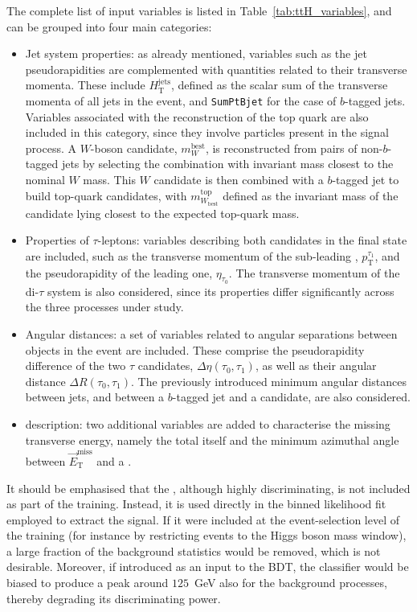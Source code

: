 The complete list of input variables is listed in Table~\ref{tab:ttH_variables}, and can be grouped into four main categories:  
\begin{itemize}
    \item Jet system properties: as already mentioned, variables such as the jet pseudorapidities are complemented with quantities related to their transverse momenta. These include $H^{\text{jets}}_{\text{T}}$, defined as the scalar sum of the transverse momenta of all jets in the event, and \texttt{SumPtBjet} for the case of $b$-tagged jets. Variables associated with the reconstruction of the top quark are also included in this category, since they involve particles present in the signal process. A $W$-boson candidate, $m^{\text{best}}_{W}$, is reconstructed from pairs of non-$b$-tagged jets by selecting the combination with invariant mass closest to the nominal $W$ mass. This $W$ candidate is then combined with a $b$-tagged jet to build top-quark candidates, with $m^{\text{top}}_{W_{\text{best}}}$ defined as the invariant mass of the candidate lying closest to the expected top-quark mass.
    \item Properties of $\tau$-leptons: variables describing both \tauhad candidates in the final state are included, such as the transverse momentum of the sub-leading \tauhad, $p^{\tau_1}_{\text{T}}$, and the pseudorapidity of the leading one, $\eta_{\tau_0}$. The transverse momentum of the di-$\tau$ system is also considered, since its properties differ significantly across the three processes under study.
    \item Angular distances: a set of variables related to angular separations between objects in the event are included. These comprise the pseudorapidity difference of the two $\tau$ candidates, $\Delta\eta(\tau_0,\tau_1)$, as well as their angular distance $\Delta R(\tau_0,\tau_1)$. The previously introduced minimum angular distances between jets, and between a $b$-tagged jet and a \tauhad candidate, are also considered.
    \item \etmiss description: two additional variables are added to characterise the missing transverse energy, namely the total \etmiss itself and the minimum azimuthal angle between $\vec{E}^{\text{miss}}_{\text{T}}$ and a \tauhad.
\end{itemize}

It should be emphasised that the \mmc, although highly discriminating, is not included as part of the training. Instead, it is used directly in the binned likelihood fit employed to extract the signal. If it were included at the event-selection level of the training (for instance by restricting events to the Higgs boson mass window), a large fraction of the background statistics would be removed, which is not desirable. Moreover, if introduced as an input to the BDT, the classifier would be biased to produce a peak around $125$~GeV also for the background processes, thereby degrading its discriminating power.

